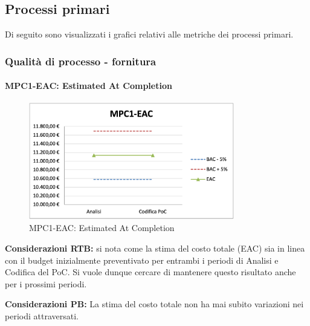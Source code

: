 \subsection{Processi primari} \label{sec:processi_primari}
Di seguito sono visualizzati i grafici relativi alle metriche dei processi primari. 
\subsubsection{Qualità di processo - fornitura}
\paragraph{MPC1-EAC: Estimated At Completion}
\begin{figure}[h!]
    \centering
    \includegraphics[width=0.8\textwidth]{images/MPC1-EAC.png}
    \caption{MPC1-EAC: Estimated At Completion}
\end{figure}
\noindent \textbf{Considerazioni RTB:} si nota come la stima del costo totale (EAC) sia in linea con il budget inizialmente preventivato per entrambi i periodi di Analisi e Codifica del PoC. Si vuole dunque cercare di mantenere questo risultato anche per i prossimi periodi.

\vspace{0.5cm}

\noindent \textbf{Considerazioni PB:} La stima del costo totale non ha mai subito variazioni nei periodi attraversati.

\newpage
